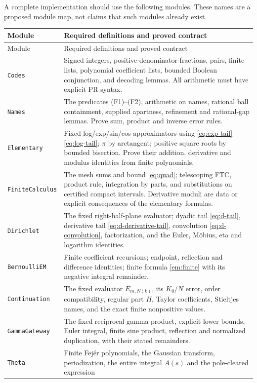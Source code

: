 A complete implementation should use the following modules. These names
are a proposed module map, not claims that such modules already exist.
\begin{longtable}{p{}p{}}
\toprule
Module & Required definitions and proved contract\\\midrule
\endfirsthead
\toprule Module & Required definitions and proved contract\\\midrule
\endhead
\texttt{Codes} & Signed integers, positive-denominator fractions, pairs,
finite lists, polynomial coefficient lists, bounded Boolean conjunction,
and decoding lemmas. All arithmetic must have explicit PR syntax.\\
\texttt{Names} & The predicates (F1)--(F2), arithmetic on names, rational
ball containment, supplied apartness, refinement and rational-gap lemmas.
Prove sum, product and inverse error rules.\\
\texttt{Elementary} & Fixed log/exp/sin/cos approximators using
\eqref{eq:exp-tail}--\eqref{eq:log-tail}; $\pi$ by arctangent; positive
square roots by bounded bisection. Prove their addition, derivative and
modulus identities from finite polynomials.\\
\texttt{FiniteCalculus} & The mesh sums and bound \eqref{eq:quad};
telescoping FTC, product rule, integration by parts, and substitutions on
certified compact intervals. Derivative moduli are data or explicit
consequences of the elementary formulas.\\
\texttt{Dirichlet} & The fixed right-half-plane evaluator; dyadic tail
\eqref{eq:d-tail}, derivative tail \eqref{eq:d-derivative-tail},
convolution \eqref{eq:d-convolution}, factorization, and the Euler,
M\"obius, eta and logarithm identities.\\
\texttt{BernoulliEM} & Finite coefficient recursions; endpoint,
reflection and difference identities; finite formula \eqref{em:finite}
with its negative integral remainder.\\
\texttt{Continuation} & The fixed evaluator $E_{m,N(k)}$, its $K_0/N$
error, order compatibility, regular part $H$, Taylor coefficients,
Stieltjes names, and the exact finite nonpositive values.\\
\texttt{GammaGateway} & The fixed reciprocal-gamma product, explicit
lower bounds, Euler integral, finite sine product, reflection and
normalized duplication, with their stated remainders.\\
\texttt{Theta} & Finite Fej\'er polynomials, the Gaussian transform,
periodization, the entire integral $A(s)$ and the pole-cleared expression

\end{longtable}
